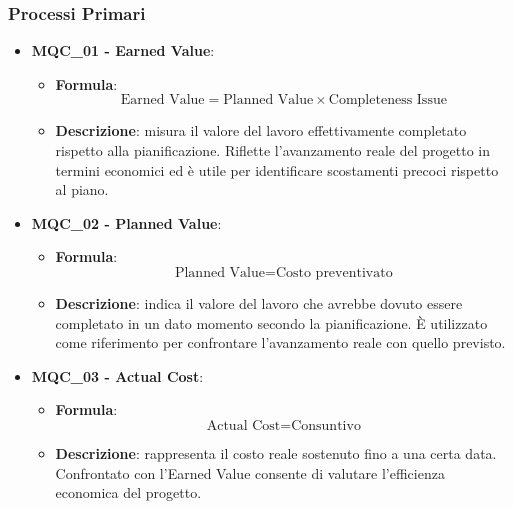 \subsubsection{Processi Primari}
\begin{itemize}
\item \textbf{MQC\_01 - Earned Value}:
    \begin{itemize}
        \item \textbf{Formula}:
        \[
            \text{Earned Value} =
            \text{Planned Value} \times \text{Completeness Issue}
        \]
        \item \textbf{Descrizione}: misura il valore del lavoro effettivamente completato rispetto alla pianificazione. Riflette l’avanzamento reale del progetto in termini economici ed è utile per identificare scostamenti precoci rispetto al piano.
    \end{itemize}

\item \textbf{MQC\_02 - Planned Value}:
    \begin{itemize}
        \item \textbf{Formula}:
        \[
            \text{Planned Value} = \text{Costo preventivato}
        \]
        \item \textbf{Descrizione}: indica il valore del lavoro che avrebbe dovuto essere completato in un dato momento secondo la pianificazione. È utilizzato come riferimento per confrontare l’avanzamento reale con quello previsto.
    \end{itemize}

\item \textbf{MQC\_03 - Actual Cost}:
    \begin{itemize}
        \item \textbf{Formula}:
        \[
            \text{Actual Cost} = \text{Consuntivo}
        \]
        \item \textbf{Descrizione}: rappresenta il costo reale sostenuto fino a una certa data. Confrontato con l’Earned Value consente di valutare l’efficienza economica del progetto.
    \end{itemize}


\end{itemize}

